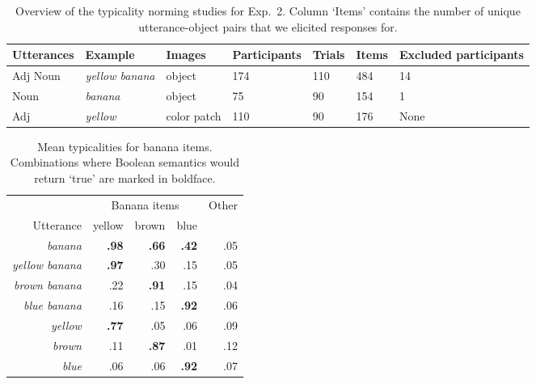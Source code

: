 \documentclass[11pt]{article}
\begin{document}
\begin{table}[bt!]
	\begin{tabular}{l l l l l l l}
		\toprule
		Utterances & Example & Images & Participants & Trials & Items & Excluded participants\\
		\midrule
		Adj Noun & \emph{yellow banana} & object & 174 & 110 & 484 & 14\\ 
		Noun & \emph{banana} & object & 75 & 90 & 154 & 1\\
		Adj & \emph{yellow} & color patch & 110 & 90 & 176 & None\\
		\bottomrule
	\end{tabular}
	\vspace{2mm}
	\caption{Overview of the typicality norming studies for Exp.~2. Column `Items' contains the number of unique utterance-object pairs that we elicited responses for.} %
	\label{tab:normingoverview}
\end{table}

\begin{table}[bt!]
	\caption{Mean typicalities for banana items. Combinations where Boolean semantics would return `true' are marked in boldface.}
\centering
	\begin{tabular}{r r r r r}
		\toprule
		& \multicolumn{3}{c}{Banana items} & Other \\
		Utterance & yellow & brown  & blue & \\ 
		\midrule
		\emph{banana} & \textbf{.98} & \textbf{.66} & \textbf{.42} & .05  \\
		\midrule
		\emph{yellow banana} & \textbf{.97} & .30 & .15 & .05 \\
		\emph{brown banana} & .22 & \textbf{.91} & .15 & .04\\
		\emph{blue banana} & .16 & .15 & \textbf{.92} & .06\\
		\midrule
		\emph{yellow} & \textbf{.77} & .05 & .06 & .09 \\
		\emph{brown} & .11 & \textbf{.87} & .01 & .12\\
		\emph{blue} & .06 & .06 & \textbf{.92} & .07\\		
		\bottomrule
	\end{tabular}
	\vspace{5mm}
	\label{tab:bananatypicalities}
\end{table}
\end{document}
